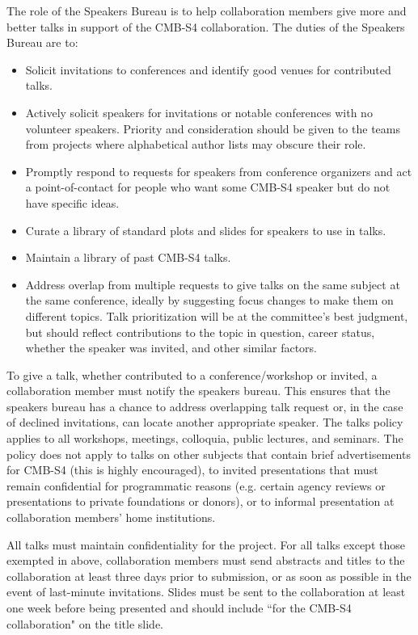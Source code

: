 The role of the Speakers Bureau is to help collaboration members give more and better talks in support of the CMB-S4 collaboration. The duties of the Speakers Bureau are to:
\begin{itemize}
\item Solicit invitations to conferences and identify good venues for contributed talks.
\item Actively solicit speakers for invitations or notable conferences with no volunteer speakers. Priority and consideration should be given to the teams from projects where alphabetical author lists may obscure their role. 
\item Promptly respond to requests for speakers from conference organizers and act a point-of-contact for people who want some CMB-S4 speaker but do not have specific ideas.
\item Curate a library of standard plots and slides for speakers to use in talks.
\item Maintain a library of past CMB-S4 talks.
\item Address overlap from multiple requests to give talks on the same subject at the same conference, ideally by suggesting focus changes to make them on different topics. Talk prioritization will be at the committee's best judgment, but should reflect contributions to the topic in question, career status, whether the speaker was invited, and other similar factors.
\end{itemize}

To give a talk, whether contributed to a conference/workshop or invited,  a collaboration member must notify the speakers bureau. This ensures that the speakers bureau has a chance to address overlapping talk request or, in the case of declined invitations, can locate another appropriate speaker.  The talks policy applies to all workshops, meetings, colloquia, public lectures, and seminars.  The policy does not apply to talks on other subjects that contain brief advertisements for CMB-S4 (this is highly encouraged), to invited presentations that must remain confidential for programmatic reasons (e.g. certain agency reviews or presentations to private foundations or donors), or to informal presentation at collaboration members' home institutions.  

All talks must maintain confidentiality for the project. For all talks except those exempted in above, collaboration members must send abstracts and titles to the collaboration at least three days prior to submission, or as soon as possible in the event of last-minute invitations. Slides must be sent to the collaboration at least one week before being presented and should include ``for the CMB-S4 collaboration" on the title slide.


